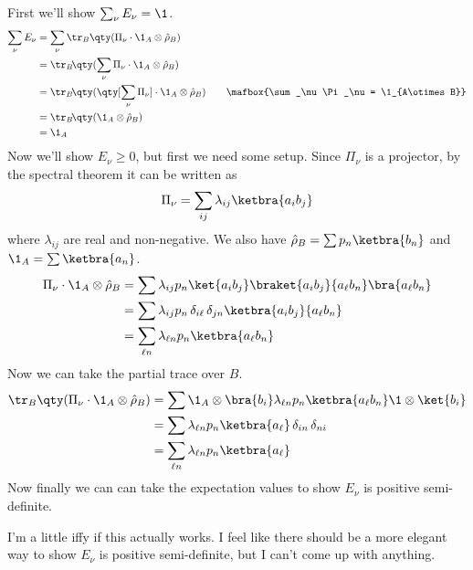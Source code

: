 \documentclass[
	pages,
	boxes,
	color=RoyalPurple
]{homework}
\makeatletter
\numberwithin{tcb@cnt@prob}{section}
\makeatother
\begin{document}
\begin{solution}
    First we'll show $\sum_\nu E_\nu = \1$.
    \begin{align*}
        \sum_\nu E_\nu & = \sum_\nu \tr_B\qty(\Pi_\nu\cdot \1_A\otimes \hat{\rho}_B)                                                           \\
                       & = \tr_B\!\qty(\sum_\nu\Pi_\nu\cdot \1_A\otimes\hat{\rho}_B)                                                           \\
                       & = \tr_B\!\qty(\qty[\sum_\nu\Pi_\nu]\cdot \1_A\otimes\hat{\rho}_B) \tag*{$\mafbox{\sum_\nu\Pi_\nu = \1_{A\otimes B}}$} \\
                       & = \tr_B\!\qty(\1_A\otimes\hat{\rho}_B)                                                                                \\
                       & = \1_A
    \end{align*}
    Now we'll show $E_\nu\geq 0$, but first we need some setup. Since $\Pi_\nu$ is a projector, by the spectral theorem it can be written as
    \begin{equation*}
        \Pi_\nu = \sum_{ij}\lambda_{ij}\ketbra{a_i b_j}
    \end{equation*}
    where $\lambda_{ij}$ are real and non-negative. We also have $\hat{\rho}_B = \sum p_n\ketbra{b_n}$ and $\1_A = \sum\ketbra{a_n}$.
    \begin{align*}
        \Pi_\nu\cdot \1_A\otimes \hat{\rho}_B & = \sum \lambda_{ij} p_n\ket{a_i b_j}\braket{a_i b_j}{a_\ell b_n}\bra{a_\ell b_n} \\
                                              & = \sum\lambda_{ij}p_n\,\delta_{i\ell}\,\delta_{jn}\ketbra{a_i b_j}{a_\ell b_n}   \\
                                              & = \sum_{\ell n}\lambda_{\ell n}p_n\ketbra{a_\ell b_n}
    \end{align*}
    Now we can take the partial trace over $B$.
    \begin{align*}
        \tr_B\qty(\Pi_\nu\cdot \1_A\otimes\hat{\rho}_B) & = \sum \1_A\otimes\bra{b_i}\lambda_{\ell n}p_n\ketbra{a_\ell b_n}\1\otimes\ket{b_i} \\
                                                        & = \sum \lambda_{\ell n}p_n\ketbra{a_\ell}\,\delta_{in}\,\delta_{ni}                 \\
                                                        & = \sum_{\ell n}\lambda_{\ell n}p_n\ketbra{a_\ell}
    \end{align*}
    Now finally we can can take the expectation values to show $E_\nu$ is positive semi-definite.


    I'm a little iffy if this actually works. I feel like there should be a more elegant way to show $E_\nu$ is positive semi-definite, but I can't come up with anything.
\end{solution}
\end{document}
